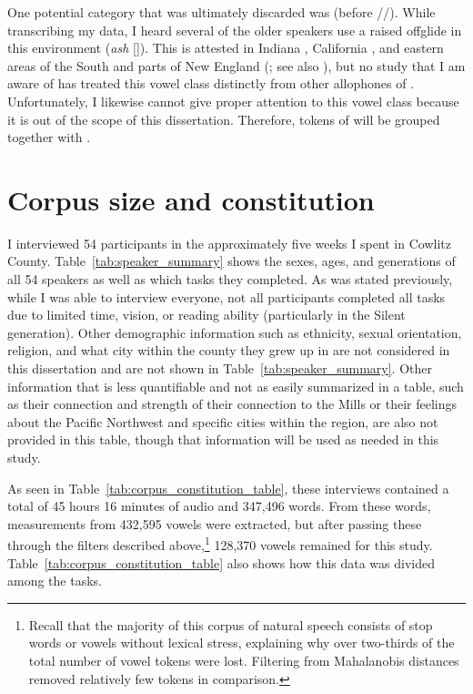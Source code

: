 One potential category that was ultimately discarded was \bash (\trap before //). While transcribing my data, I heard several of the older speakers use a raised offglide in this environment (\textit{ash} []). This is attested in Indiana \citep{carmony_1970}, California \citep{galloway_1967}, and eastern areas of the South and parts of New England (\citealt[104]{kurath_mcdavid_1961}; see also \citealt[41--42, footnote 27]{labov_1991}), but no study that I am aware of has treated this vowel class distinctly from other allophones of \trap. Unfortunately, I likewise cannot give proper attention to this vowel class because it is out of the scope of this dissertation. Therefore, tokens of \bash will be grouped together with \bat.




\section{Corpus size and constitution}
\label{corpus_size_constitution}

I interviewed 54 participants in the approximately five weeks I spent in Cowlitz County. Table~\ref{tab:speaker_summary} shows the sexes, ages, and generations of all 54 speakers as well as which tasks they completed. As was stated previously, while I was able to interview everyone, not all participants completed all tasks due to limited time, vision, or reading ability (particularly in the Silent generation). Other demographic information such as ethnicity, sexual orientation, religion, and what city within the county they grew up in are not considered in this dissertation and are not shown in Table~\ref{tab:speaker_summary}. Other information that is less quantifiable and not as easily summarized in a table, such as their connection and strength of their connection to the Mills or their feelings about the Pacific Northwest and specific cities within the region, are also not provided in this table, though that information will be used as needed in this study.



As seen in Table~\ref{tab:corpus_constitution_table}, these interviews contained a total of 45 hours 16 minutes of audio and 347,496 words. From these words, measurements from 432,595 vowels were extracted, but after passing these through the filters described above,\footnote{Recall that the majority of this corpus of natural speech consists of stop words or vowels without lexical stress, explaining why over two-thirds of the total number of vowel tokens were lost. Filtering from Mahalanobis distances removed relatively few tokens in comparison.} 128,370 vowels remained for this study. Table~\ref{tab:corpus_constitution_table} also shows how this data was divided among the tasks.

